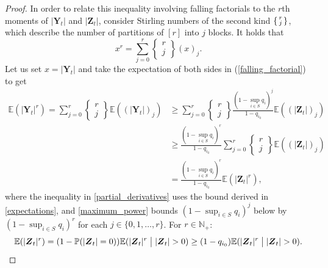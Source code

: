 \documentclass[preprint,3p,12pt]{elsarticle}
\theoremstyle{definition}
\begin{document}
\begin{proof}
In order to relate this inequality involving falling factorials to the $r$th moments of $|\boldsymbol{Y}_t|$ and $|\boldsymbol{Z}_t|$, consider Stirling numbers of the second kind $\begin{Bsmallmatrix}
r \\
j
\end{Bsmallmatrix}$, which describe the number of partitions of $[r]$ into $j$ blocks. It holds \cite[Eq.\ (2.3), p.\ 87]{combinatorics} that 
\begin{equation}
    x^{r} = \sum_{j=0}^{r} \begin{Bmatrix}
r \\
j
\end{Bmatrix} (x)_j \label{falling_factorial}.
\end{equation}
Let us set $x=|\boldsymbol{Y}_t|$ and take the expectation of both sides in (\ref{falling_factorial}) to get
\begin{align}
    \mathbb{E}(|\boldsymbol{Y}_t|^{r}) %
    = \sum_{j=0}^{r} \begin{Bmatrix}
r \\
j
\end{Bmatrix} \mathbb{E}((|\boldsymbol{Y}_t|)_{j})%
&\ge \sum_{j=0}^{r} \begin{Bmatrix}
r \\
j
\end{Bmatrix}\frac{(1-\sup_{i \in S}q_i)^j}{1-q_{i_0}} \mathbb{E}((|\boldsymbol{Z}_t|)_{j}) \label{partial_derivatives}\\
&\ge \frac{(1-\sup_{i \in S}q_i)^{r}}{1-q_{i_0}} \sum_{j=0}^{r} \begin{Bmatrix}
r \\
j
\end{Bmatrix}\mathbb{E}((|\boldsymbol{Z}_t|)_{j}) \label{maximum_power} \\
& = \frac{(1-\sup_{i \in S}q_i)^{r}}{1-q_{i_0}} \mathbb{E}(|\boldsymbol{Z}_t|^{r}), \label{k_th_moment}
\end{align}
 where the inequality in \eqref{partial_derivatives} uses the bound derived in \eqref{expectations}, and \eqref{maximum_power} bounds $(1-\sup_{i \in S}q_i)^j$ below by $(1-\sup_{i \in S}q_i)^r$ for each $j \in \{0,1,\dots,r\}$. For $r \in \mathbb{N}_+$:
        \begin{equation}
            \mathbb{E}(|\boldsymbol{Z}_t|^r) = (1- \mathbb{P}(|\boldsymbol{Z}_t|=0))\mathbb{E}(|\boldsymbol{Z}_t|^r\bigm| |\boldsymbol{Z}_t| > 0) \ge  (1- q_{i_0})\mathbb{E}(|\boldsymbol{Z}_t|^r\bigm| |\boldsymbol{Z}_t| > 0). \label{EZandEZ0}

\end{equation}
\end{proof}
\end{document}
